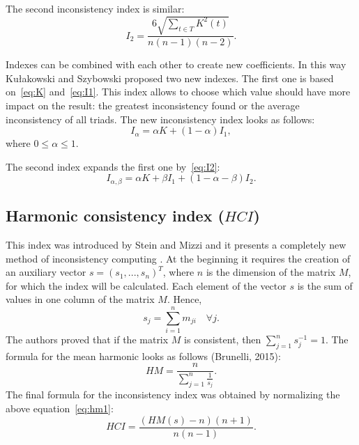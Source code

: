 The second inconsistency index is similar:
	\begin{equation} 
	 \label{eq:I2}				
		I_{2}=\frac{6\sqrt{\sum_{t\in T}K^{2}(t)}}{n(n-1)(n-2)}.
	 \end{equation}

Indexes can be combined with each other to create new coefficients. In this way Kułakowski and Szybowski proposed two new indexes. The first one is based on~\ref{eq:K} and~\ref{eq:I1}. This index allows to choose which value should have more impact on the result: the greatest inconsistency found or the average inconsistency of all triads. The new inconsistency index looks as follows:
	\begin{equation} 
		I_{\alpha}=\alpha K+(1-\alpha)I_{1},
	 \end{equation}
 where $0\leq\alpha\leq1$.
  
The second index expands the first one by~\ref{eq:I2}:
	\begin{equation} 
		I_{\alpha,\beta}=\alpha K+\beta I_{1}+(1-\alpha-\beta)I_{2}.
	 \end{equation}
 

\subsection{Harmonic consistency index ($HCI$)}

This index was introduced by Stein and Mizzi and it presents a completely new method of inconsistency computing \cite{STEIN2007}. At the beginning it requires the creation of an auxiliary vector $s=(s_{1},...,s_{n})^{T}$, where $n$ is the dimension of the matrix $M$, for which the index will be calculated. Each element of the vector $s$ is the sum of values in one column of the matrix $M$. Hence, 
	\begin{equation} 
		s_{j}=\sum_{i=1}^{n}m_{ji}\,\,\,\,\,\,\forall j.
	 \end{equation}
 The authors proved that if the matrix $M$ is consistent, then $\sum_{j=1}^{n}s_{j}^{-1}=1$. The formula for the mean harmonic looks as follows (Brunelli, 2015):
	 \begin{equation} 
		\label{eq:hm1}
		HM=\frac{n}{\sum_{j=1}^{n}\frac{1}{s_{j}}}.
	 \end{equation}
 The final formula for the inconsistency index was obtained by normalizing the above equation~\ref{eq:hm1}:
 	\begin{equation} 
		HCI=\frac{\left(HM(s)-n\right)\left(n+1\right)}{n(n-1)}.
	 \end{equation}
 

